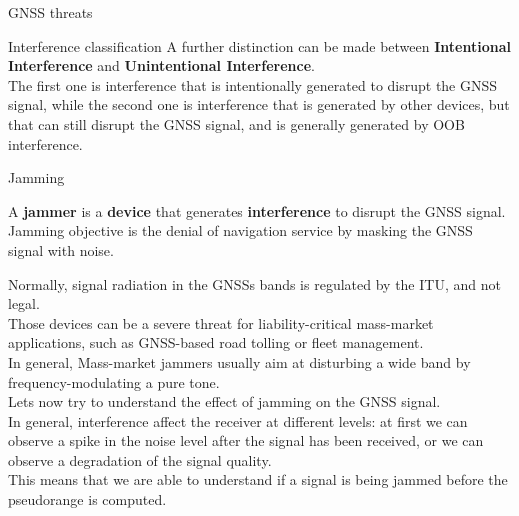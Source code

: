 \begin{section}{GNSS threats}
\begin{subsection}{Interference classification}
        A further distinction can be made between \textbf{Intentional Interference} and
        \textbf{Unintentional Interference}.\\
        The first one is interference that is intentionally generated to disrupt the GNSS signal,
        while the second one is interference that is generated by other devices, but that can still
        disrupt the GNSS signal, and is generally generated by OOB interference.\\
      \end{subsection}

      \begin{subsection}{Jamming}
        \begin{boxH}
          A \textbf{jammer} is a \textbf{device} that generates \textbf{interference} to disrupt the GNSS signal.\\
          Jamming objective is the denial of navigation service by masking the GNSS signal with
          noise.
        \end{boxH}

        Normally, signal radiation in the GNSSs bands is regulated by the ITU, and not legal.\\
        Those devices can be a severe threat for  liability-critical mass-market applications, 
        such as GNSS-based road tolling or fleet management.\\
        In general, Mass-market jammers usually aim at disturbing a wide band by 
        frequency-modulating a pure tone.\\

        Lets now try to understand the effect of jamming on the GNSS signal.\\
        In general, interference affect the receiver at different levels: at first we can observe 
        a spike in the noise level after the signal has been received, or we can observe a
        degradation of the signal quality.\\
        This means that we are able to understand if a signal is being jammed before the pseudorange
        is computed.\\


\end{subsection}
\end{section}
